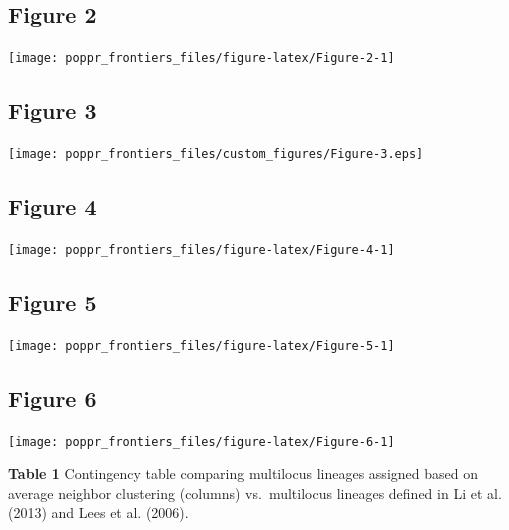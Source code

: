 \documentclass{frontiersSCNS} %
\newenvironment{CodeChunk}{}{}
\begin{document}
\subsection*{Figure 2}\label{figure-2}

\begin{CodeChunk}

\texttt{[image: poppr\_frontiers\_files/figure-latex/Figure-2-1]} \end{CodeChunk}

\subsection*{Figure 3}\label{figure-3}

\texttt{[image: poppr\_frontiers\_files/custom\_figures/Figure-3.eps]}

\subsection*{Figure 4}\label{figure-4}

\begin{CodeChunk}

\texttt{[image: poppr\_frontiers\_files/figure-latex/Figure-4-1]} \end{CodeChunk}

\subsection*{Figure 5}\label{figure-5}

\begin{CodeChunk}

\texttt{[image: poppr\_frontiers\_files/figure-latex/Figure-5-1]} \end{CodeChunk}

\subsection*{Figure 6}\label{figure-6}

\begin{CodeChunk}

\texttt{[image: poppr\_frontiers\_files/figure-latex/Figure-6-1]} \end{CodeChunk}

\textbf{Table 1} Contingency table comparing multilocus lineages
assigned based on average neighbor clustering (columns) vs.~multilocus
lineages defined in Li et al. (2013) and Lees et al. (2006).
\end{document}
